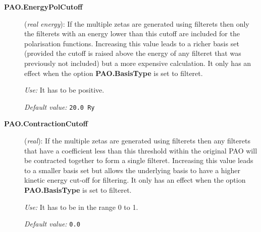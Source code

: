 \documentclass[11pt]{article}
\begin{document}
\begin{description}
\item[{\bf PAO.EnergyPolCutoff}] ({\it real energy}): If the multiple
zetas are generated using filterets then only the filterets with
an energy lower than this cutoff are included for the polarisation
functions. Increasing this value leads to a richer basis set 
(provided the cutoff is raised above the energy of any filteret 
that was previously not included) but a more expensive calculation.
It only has an effect when the option
{\bf PAO.BasisType} is set to filteret.

{\it Use:} It has to be positive.

{\it Default value:} {\tt 20.0 Ry}
\end{description}

\begin{description}
\item[{\bf PAO.ContractionCutoff}] ({\it real}): If the multiple
zetas are generated using filterets then any filterets that have
a coefficient less than this threshold within the original PAO
will be contracted together to form a single filteret.
Increasing this value leads to a smaller basis set but allows
the underlying basis to have a higher kinetic energy cut-off for
filtering. It only has an effect when the option
{\bf PAO.BasisType} is set to filteret.

{\it Use:} It has to be in the range 0 to 1.

{\it Default value:} {\tt 0.0}
\end{description}
\end{document}
